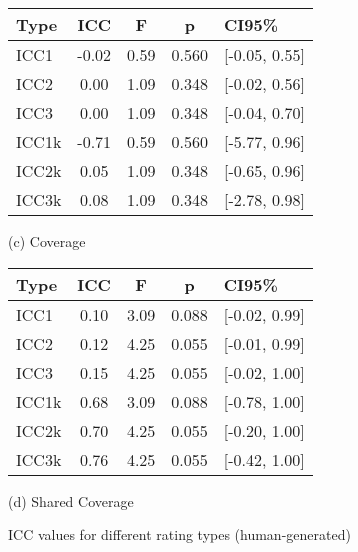 \begin{figure}[h]
    \vspace{1em}
    \begin{minipage}{.5\textwidth}
        \centering
        \begin{tabular}{lcccl}
            \hline
            \textbf{Type} & \textbf{ICC} & \textbf{F} & \textbf{p} & \textbf{CI95\%} \\
            \hline
            ICC1          & -0.02        & 0.59       & 0.560      & [-0.05, 0.55]   \\
            ICC2          & 0.00         & 1.09       & 0.348      & [-0.02, 0.56]   \\
            ICC3          & 0.00         & 1.09       & 0.348      & [-0.04, 0.70]   \\
            ICC1k         & -0.71        & 0.59       & 0.560      & [-5.77, 0.96]   \\
            ICC2k         & 0.05         & 1.09       & 0.348      & [-0.65, 0.96]   \\
            ICC3k         & 0.08         & 1.09       & 0.348      & [-2.78, 0.98]   \\
            \hline
        \end{tabular}
        \caption*{(c) Coverage}
    \end{minipage}%
    \begin{minipage}{.5\textwidth}
        \centering
        \begin{tabular}{lcccl}
            \hline
            \textbf{Type} & \textbf{ICC} & \textbf{F} & \textbf{p} & \textbf{CI95\%} \\
            \hline
            ICC1          & 0.10         & 3.09       & 0.088      & [-0.02, 0.99]   \\
            ICC2          & 0.12         & 4.25       & 0.055      & [-0.01, 0.99]   \\
            ICC3          & 0.15         & 4.25       & 0.055      & [-0.02, 1.00]   \\
            ICC1k         & 0.68         & 3.09       & 0.088      & [-0.78, 1.00]   \\
            ICC2k         & 0.70         & 4.25       & 0.055      & [-0.20, 1.00]   \\
            ICC3k         & 0.76         & 4.25       & 0.055      & [-0.42, 1.00]   \\
            \hline
        \end{tabular}
        \caption*{(d) Shared Coverage}
    \end{minipage}
    \caption{ICC values for different rating types (human-generated)}
    \label{fig:icc_human}
\end{figure}

